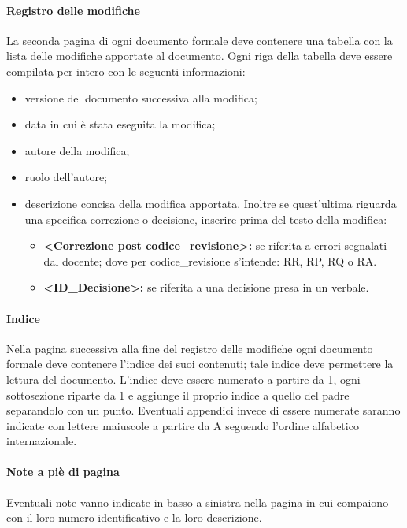                 \paragraph{Registro delle modifiche}
                La seconda pagina di ogni documento formale deve contenere una tabella con la lista delle modifiche apportate al documento. Ogni riga della tabella deve essere compilata per intero con le seguenti informazioni:
                \begin{itemize}
                    \item versione del documento successiva alla modifica;
                    \item data in cui è stata eseguita la modifica;
                    \item autore della modifica;
                    \item ruolo dell'autore;
                    \item descrizione concisa della modifica apportata. Inoltre se quest'ultima riguarda una specifica correzione o decisione, inserire prima del testo della modifica:
                    	\begin{itemize}
                    		\item \textbf{<Correzione post codice\_revisione>:} se riferita a errori segnalati dal docente; dove per codice\_revisione s'intende: RR, RP, RQ o RA.
                    		\item \textbf{<ID\_Decisione>:} se riferita a una decisione presa in un verbale.
                    	\end{itemize}
                \end{itemize}
                \paragraph{Indice}
                Nella pagina successiva alla fine del registro delle modifiche ogni documento formale deve contenere l'indice dei suoi contenuti; tale indice deve permettere la lettura  del documento. L'indice deve essere numerato a partire da 1, ogni sottosezione riparte da 1 e aggiunge il proprio indice a quello del padre separandolo con un punto. Eventuali appendici invece di essere numerate saranno indicate con lettere maiuscole a partire da A seguendo l'ordine alfabetico internazionale.
                \paragraph{Note a piè di pagina}
                Eventuali note vanno indicate in basso a sinistra nella pagina in cui compaiono con il loro numero identificativo e la loro descrizione.
